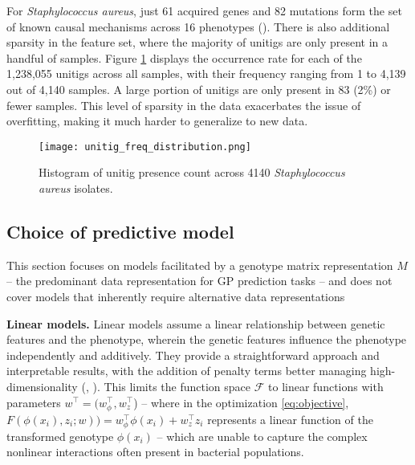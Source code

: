 \documentclass[12pt]{article}
\begin{document}
For \textit{Staphylococcus aureus}, just 61 acquired genes and 82 mutations form the set of known causal mechanisms across 16 phenotypes (\cite{wheeler2019contrasting}). There is also additional sparsity in the feature set, where the majority of unitigs are only present in a handful of samples. Figure \ref{fig:unitig_freq} displays the occurrence rate for each of the 1,238,055 unitigs across all samples, with their frequency ranging from 1 to 4,139 out of 4,140 samples. A large portion of unitigs are only present in 83 (2\%) or fewer samples. This level of sparsity in the data exacerbates the issue of overfitting, making it much harder to generalize to new data.

\begin{figure}
    \centering
    \texttt{[image: unitig\_freq\_distribution.png]}
    \caption{Histogram of unitig presence count across 4140 \textit{Staphylococcus aureus} isolates.}
    \label{fig:unitig_freq}
\end{figure}



\subsection{Choice of predictive model}\label{sec:model_choice}

This section focuses on models facilitated by a genotype matrix representation $M$ -- the predominant data representation for GP prediction tasks -- and does not cover models that inherently require alternative data representations

\textbf{Linear models.} Linear models assume a linear relationship between genetic features and the phenotype, wherein the genetic features influence the phenotype independently and additively. They provide a straightforward approach and interpretable results, with the addition of penalty terms better managing high-dimensionality (\cite{burgaya2023bacterial}, \cite{saber2020benchmarking}). This limits the function space $\mathcal{F}$ to linear functions with parameters $w^\intercal = (w_{\phi}^\intercal, w_z^\intercal$) -- where in the optimization \ref{eq:objective}, $F(\phi(x_i),z_i; w)) = w_{\phi}^\intercal\phi(x_i) + w_{z}^\intercal z_i$ represents a linear function of the transformed genotype $\phi(x_i)$ -- which are unable to capture the complex nonlinear interactions often present in bacterial populations. 
\end{document}
